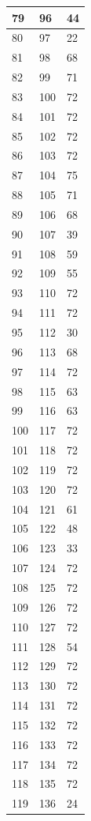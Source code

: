 \begin{tabular}{p{}p{}p{}}
\hline
79 & 96 & 44 \\
\hline
80 & 97 & 22 \\
\hline
81 & 98 & 68 \\
\hline
82 & 99 & 71 \\
\hline
83 & 100 & 72 \\
\hline
84 & 101 & 72 \\
\hline
85 & 102 & 72 \\
\hline
86 & 103 & 72 \\
\hline
87 & 104 & 75 \\
\hline
88 & 105 & 71 \\
\hline
89 & 106 & 68 \\
\hline
90 & 107 & 39 \\
\hline
91 & 108 & 59 \\
\hline
92 & 109 & 55 \\
\hline
93 & 110 & 72 \\
\hline
94 & 111 & 72 \\
\hline
95 & 112 & 30 \\
\hline
96 & 113 & 68 \\
\hline
97 & 114 & 72 \\
\hline
98 & 115 & 63 \\
\hline
99 & 116 & 63 \\
\hline
100 & 117 & 72 \\
\hline
101 & 118 & 72 \\
\hline
102 & 119 & 72 \\
\hline
103 & 120 & 72 \\
\hline
104 & 121 & 61 \\
\hline
105 & 122 & 48 \\
\hline
106 & 123 & 33 \\
\hline
107 & 124 & 72 \\
\hline
108 & 125 & 72 \\
\hline
109 & 126 & 72 \\
\hline
110 & 127 & 72 \\
\hline
111 & 128 & 54 \\
\hline
112 & 129 & 72 \\
\hline
113 & 130 & 72 \\
\hline
114 & 131 & 72 \\
\hline
115 & 132 & 72 \\
\hline
116 & 133 & 72 \\
\hline
117 & 134 & 72 \\
\hline
118 & 135 & 72 \\
\hline
119 & 136 & 24 \\

\end{tabular}
